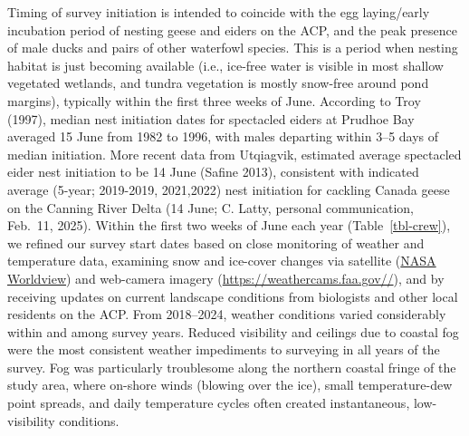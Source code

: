 \documentclass[
]{article}
\begin{document}
Timing of survey initiation is intended to coincide with the egg
laying/early incubation period of nesting geese and eiders on the ACP,
and the peak presence of male ducks and pairs of other waterfowl
species. This is a period when nesting habitat is just becoming
available (i.e., ice-free water is visible in most shallow vegetated
wetlands, and tundra vegetation is mostly snow-free around pond
margins), typically within the first three weeks of June. According to
Troy (1997), median nest initiation dates for spectacled eiders at
Prudhoe Bay averaged 15 June from 1982 to 1996, with males departing
within 3--5 days of median initiation. More recent data from Utqiagvik,
estimated average spectacled eider nest initiation to be 14 June (Safine
2013), consistent with indicated average (5-year; 2019-2019, 2021,2022)
nest initiation for cackling Canada geese on the Canning River Delta (14
June; C. Latty, personal communication, Feb.~11, 2025). Within the first
two weeks of June each year (Table~\ref{tbl-crew}), we refined our
survey start dates based on close monitoring of weather and temperature
data, examining snow and ice-cover changes via satellite
(\href{https://worldview.earthdata.nasa.gov/}{NASA Worldview}) and
web-camera imagery (\url{https://weathercams.faa.gov//}), and by
receiving updates on current landscape conditions from biologists and
other local residents on the ACP. From 2018--2024, weather conditions
varied considerably within and among survey years. Reduced visibility
and ceilings due to coastal fog were the most consistent weather
impediments to surveying in all years of the survey. Fog was
particularly troublesome along the northern coastal fringe of the study
area, where on-shore winds (blowing over the ice), small temperature-dew
point spreads, and daily temperature cycles often created instantaneous,
low-visibility conditions.

\newpage{}

\begingroup\fontsize{10}{12}\selectfont
\end{document}
